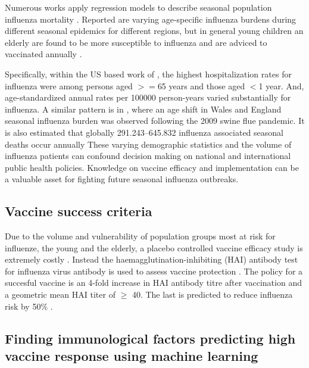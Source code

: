 Numerous works apply regression models to describe seasonal population
influenza mortality \citep{zhouHospitalizationsAssociatedInfluenza2012,
greenMortalityAttributableInfluenza2013, iulianoEstimatesGlobalSeasonal2018}.
Reported are varying age-specific influenza burdens during different seasonal
epidemics for different regions, but in general young children an elderly are
found to be more susceptible to influenza and are adviced to vaccinated
annually \citep{zhouHospitalizationsAssociatedInfluenza2012}.

Specifically, within the US based work of
\cite{zhouHospitalizationsAssociatedInfluenza2012}, the highest hospitalization
rates for influenza were among persons aged $>=$65 years and those aged $<$1
year.  And, age-standardized annual rates per 100000 person-years varied
substantially for influenza. A similar pattern is in
\cite{greenMortalityAttributableInfluenza2013}, where an age shift in Wales and
England seasonal influenza burden was observed following the 2009 swine flue
pandemic. It is also estimated that globally 291.243–645.832 influenza associated
seasonal deaths occur annually \citep{iulianoEstimatesGlobalSeasonal2018} These
varying demographic statistics and the volume of influenza patients can confound
decision making on national and international public health policies.
Knowledge on vaccine efficacy and implementation can be a valuable asset for
fighting future seasonal influenza outbreaks.

\subsection{Vaccine success criteria}

Due to the volume and vulnerability of population groups most at risk for
influenze, the young and the elderly, a placebo controlled vaccine efficacy
study is extremely costly \citep{zhouHospitalizationsAssociatedInfluenza2012}.
Instead the haemagglutination-inhibiting (HAI) antibody test for influenza
virus antibody is used to assess vaccine protection
\citep{dejongHaemagglutinationinhibitingAntibodyInfluenza2003}. The policy for
a succesful vaccine is an 4-fold increase in HAI antibody titre after
vaccination and a geometric mean HAI titer of $\geq$ 40. The last is predicted
to reduce influenza risk by 50\%
\cite{dejongHaemagglutinationinhibitingAntibodyInfluenza2003}.

\subsection{Finding immunological factors predicting high vaccine response using machine learning}

